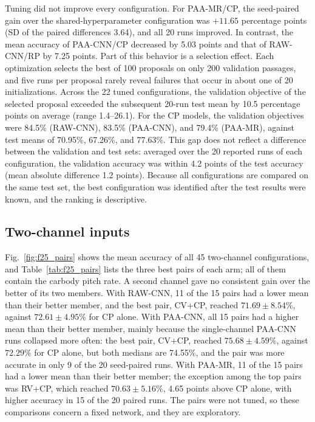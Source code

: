 Tuning did not improve every configuration. For PAA-MR/CP, the seed-paired gain
over the shared-hyperparameter configuration was $+11.65$ percentage points
(SD of the paired differences 3.64), and all 20 runs improved. In contrast, the
mean accuracy of PAA-CNN/CP decreased by 5.03 points and that of RAW-CNN/RP by
7.25 points. Part of this behavior is a selection effect. Each optimization
selects the best of 100 proposals on only 200 validation passages, and five
runs per proposal rarely reveal failures that occur in about one of 20
initializations. Across the 22 tuned configurations, the validation objective
of the selected proposal exceeded the subsequent 20-run test mean by 10.5
percentage points on average (range 1.4--26.1). For the CP models, the
validation objectives were 84.5\% (RAW-CNN), 83.5\% (PAA-CNN), and 79.4\%
(PAA-MR), against test means of 70.95\%, 67.26\%, and 77.63\%. This gap does not
reflect a difference between the validation and test sets: averaged over the
20 reported runs of each configuration, the validation accuracy was within
4.2 points of the test accuracy (mean absolute difference 1.2 points). Because
all
configurations are compared on the same test set, the best configuration was
identified after the test results were known, and the ranking is descriptive.

\subsection{Two-channel inputs}
\label{sec:pairs}

Fig.~\ref{fig:f25_pairs} shows the mean accuracy of all 45 two-channel
configurations, and Table~\ref{tab:f25_pairs} lists the three best pairs of
each arm; all of them contain the carbody pitch rate. A second channel gave no
consistent gain over the better of its two members. With RAW-CNN, 11 of the 15
pairs had a lower mean than their better member, and the best pair, CV+CP,
reached $71.69\pm8.54\%$, against $72.61\pm4.95\%$ for CP alone. With PAA-CNN,
all 15 pairs had a higher mean than their better member, mainly because the
single-channel PAA-CNN runs collapsed more often: the best pair, CV+CP, reached
$75.68\pm4.59\%$, against $72.29\%$ for CP alone, but both medians are 74.55\%,
and the pair was more accurate in only 9 of the 20 seed-paired runs. With
PAA-MR, 11 of the 15 pairs had a lower mean than their better member; the
exception among the top pairs was RV+CP, which reached $70.63\pm5.16\%$, 4.65
points above CP alone, with higher accuracy in 15 of the 20 paired runs. The
pairs were not tuned, so these comparisons concern a fixed network, and they
are exploratory.


